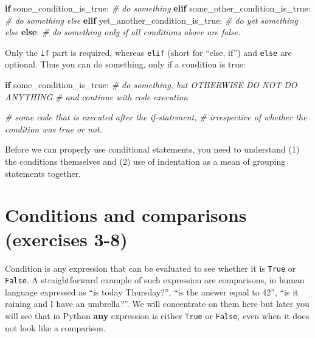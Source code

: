 \documentclass[
]{book}
\newenvironment{Shaded}{\begin{snugshade}}{\end{snugshade}}
\newcommand{\CommentTok}[1]{\textcolor[rgb]{0.56,0.35,0.01}{\textit{#1}}}
\newcommand{\ControlFlowTok}[1]{\textcolor[rgb]{0.13,0.29,0.53}{\textbf{#1}}}
\newcommand{\NormalTok}[1]{#1}
\begin{document}
\begin{Shaded}
\begin{Highlighting}[]
\ControlFlowTok{if}\NormalTok{ some\_condition\_is\_true:}
    \CommentTok{\# do something}
\ControlFlowTok{elif}\NormalTok{ some\_other\_condition\_is\_true:}
    \CommentTok{\# do something else}
\ControlFlowTok{elif}\NormalTok{ yet\_another\_condition\_is\_true:}
    \CommentTok{\# do yet something else}
\ControlFlowTok{else}\NormalTok{:}
    \CommentTok{\# do something only if all conditions above are false.}
\end{Highlighting}
\end{Shaded}

Only the \texttt{if} part is required, whereas \texttt{elif} (short for ``else, if'') and \texttt{else} are optional. Thus you can do something, only if a condition is true:

\begin{Shaded}
\begin{Highlighting}[]
\ControlFlowTok{if}\NormalTok{ some\_condition\_is\_true:}
    \CommentTok{\# do something, but OTHERWISE DO NOT DO ANYTHING }
    \CommentTok{\# and continue with code execution}
  
\CommentTok{\# some code that is executed after the if{-}statement,}
\CommentTok{\# irrespective of whether the condition was true or not.}
\end{Highlighting}
\end{Shaded}

Before we can properly use conditional statements, you need to understand (1) the conditions themselves and (2) use of indentation as a mean of grouping statements together.

\hypertarget{conditions-and-comparisons-exercises-3-8}{%
\section{Conditions and comparisons (exercises 3-8)}\label{conditions-and-comparisons-exercises-3-8}}

Condition is any expression that can be evaluated to see whether it is \texttt{True} or \texttt{False}. A straightforward example of such expression are comparisons, in human language expressed as ``is today Thursday?'', ``is the answer equal to 42'', ``is it raining and I have an umbrella?''. We will concentrate on them here but later you will see that in Python \textbf{any} expression is either \texttt{True} or \texttt{False}, even when it does not look like a comparison.
\end{document}
